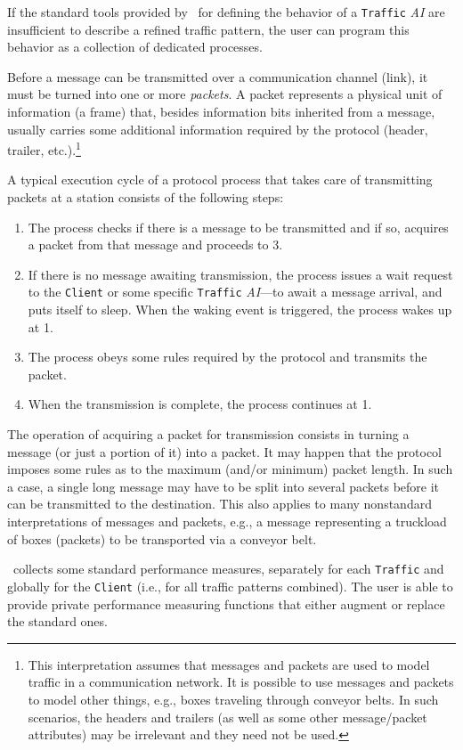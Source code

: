 If the standard tools provided by \smurph\ for defining the behavior of a
{\tt Traffic} {\em AI\/} are insufficient to describe a refined traffic
pattern, the user can program this behavior as a collection of dedicated
processes.

Before a message can be transmitted over a communication
channel (link), it must be turned into one or more {\em packets}.
A packet represents a physical unit of information (a frame) that,
besides information bits inherited from a message,
usually carries some additional information required
by the protocol (header, trailer, etc.).\footnote{This interpretation assumes
that messages and packets are used to model traffic in a communication network.
It is possible to use messages and packets to model other things, e.g.,
boxes traveling through conveyor belts.
In such scenarios, the headers and trailers (as well as some other
message/packet attributes) may be irrelevant and they need not be used.}

A typical execution cycle of a protocol process that takes care of
transmitting packets at a station consists of the following steps:
\begin{enumerate}
\item
The process checks if there is a message to be transmitted and if so,
acquires a packet from that message and proceeds to 3.
\item
If there is no message awaiting transmission,
the process issues a wait request to the {\tt Client} or some
specific {\tt Traffic} {\em AI\/}---to await a message arrival, and puts
itself to sleep.
When the waking event is triggered, the process wakes up at 1.
\item
The process obeys some rules required by the protocol and transmits the packet.
\item
When the transmission is complete, the process continues at 1.
\end{enumerate}

The operation of acquiring a packet for transmission consists in turning
a message (or just a portion of it) into a packet.
It may happen that the protocol imposes some rules
as to the maximum (and/or minimum) packet length.
In such a case,
a single long message may have to be split into several packets before
it can be transmitted to the destination.
This also applies to many nonstandard interpretations of messages and
packets, e.g., a message representing a truckload of boxes (packets)
to be transported via a conveyor belt.

\smurph\ collects some standard performance measures, separately for each
{\tt Traffic} and globally for the {\tt Client} (i.e., for all
traffic patterns combined).
The user is able to provide private performance measuring functions that
either augment or replace the standard ones.

